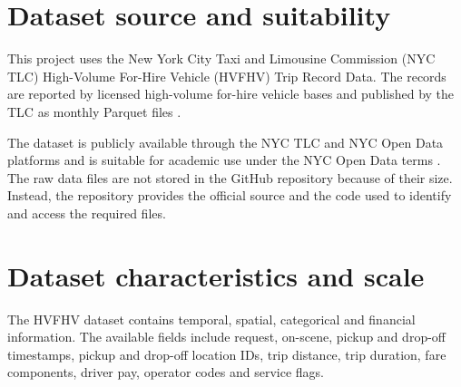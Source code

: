 \documentclass[10pt,twocolumn]{article}
\begin{document}


\section{Dataset source and suitability}

This project uses the New York City Taxi and Limousine Commission
(NYC TLC) High-Volume For-Hire Vehicle (HVFHV) Trip Record Data.
The records are reported by licensed high-volume for-hire vehicle
bases and published by the TLC as monthly Parquet files
\cite{tlc,dict}.

The dataset is publicly available through the NYC TLC and NYC Open
Data platforms and is suitable for academic use under the NYC Open
Data terms \cite{opendata}. The raw data files are not stored in the
GitHub repository because of their size. Instead, the repository
provides the official source and the code used to identify and access
the required files.


\section{Dataset characteristics and scale}

The HVFHV dataset contains temporal, spatial, categorical and financial
information. The available fields include request, on-scene, pickup and
drop-off timestamps, pickup and drop-off location IDs, trip distance,
trip duration, fare components, driver pay, operator codes and service
flags.
\end{document}
